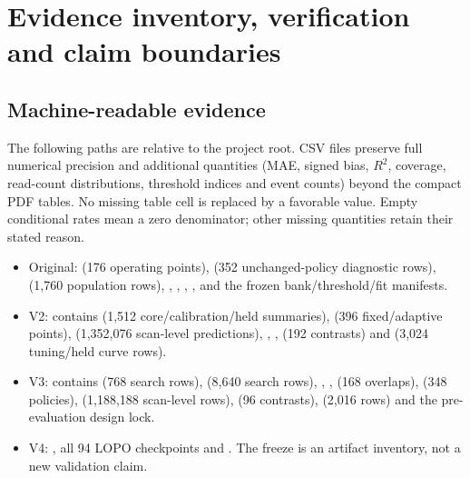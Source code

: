 \documentclass[10pt,a4paper]{article}
\begin{document}
\section{Evidence inventory, verification and claim boundaries}
\subsection{Machine-readable evidence}
The following paths are relative to the project root. CSV files preserve full numerical precision and additional quantities (MAE, signed bias, $R^2$, coverage, read-count distributions, threshold indices and event counts) beyond the compact PDF tables. No missing table cell is replaced by a favorable value. Empty conditional rates mean a zero denominator; other missing quantities retain their stated reason.
\begin{itemize}
\item Original:  (176 operating points),  (352 unchanged-policy diagnostic rows),  (1,760 population rows), , , , , and the frozen bank/threshold/fit manifests.
\item V2:  contains  (1,512 core/calibration/held summaries),  (396 fixed/adaptive points),  (1,352,076 scan-level predictions), , ,  (192 contrasts) and  (3,024 tuning/held curve rows).
\item V3:  contains  (768 search rows),  (8,640 search rows), , ,  (168 overlaps),  (348 policies),  (1,188,188 scan-level rows),  (96 contrasts),  (2,016 rows) and the pre-evaluation design lock.
\item V4: , all 94 LOPO checkpoints and . The freeze is an artifact inventory, not a new validation claim.
\end{itemize}
\end{document}
